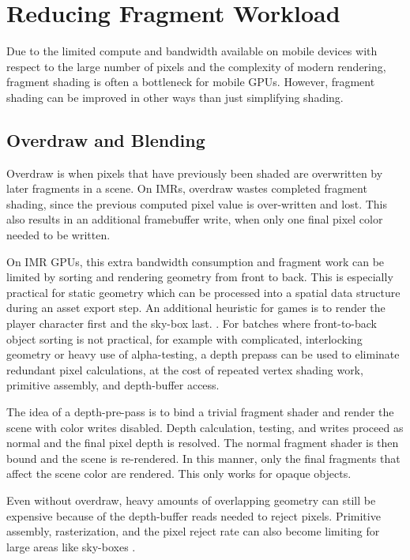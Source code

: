\section{Reducing Fragment Workload}
\label{Jon-McCaffrey-Reducing-Fragment-Workload}


Due to the limited compute and bandwidth available on mobile devices with
respect to the large number of pixels and the complexity of modern rendering,
fragment shading is often a bottleneck for mobile GPUs.  However, fragment
shading can be improved in other ways than just simplifying shading.

\subsection{Overdraw and Blending}\label{Jon-McCaffrey-Overdraw-And-Blending}
Overdraw is when pixels that have previously been shaded are overwritten by
later fragments in a scene.  On IMRs, overdraw wastes completed fragment
shading, since the previous computed pixel value is over-written and lost.
This also results in an additional framebuffer write, when only one final pixel
color needed to be written.

On IMR GPUs, this extra bandwidth consumption and fragment work can be limited
by sorting and rendering geometry from front to back.  This is especially
practical for static geometry which can be processed into a spatial data
structure during an asset export step.  An additional heuristic for games is to
render the player character first and the sky-box last.
\cite{Pranckevicius11a}.  For batches where front-to-back object sorting is not
practical, for example with complicated, interlocking geometry or heavy use of
alpha-testing, a depth prepass can be used to eliminate redundant pixel
calculations, at the cost of repeated vertex shading work, primitive assembly,
and depth-buffer access.

The idea of a depth-pre-pass is to bind a trivial fragment shader and render
the scene with color writes disabled.  Depth calculation, testing, and writes
proceed as normal and the final pixel depth is resolved.  The normal
fragment shader is then bound and the scene is re-rendered.  In this manner,
only the final fragments that affect the scene color are rendered.  This only
works for opaque objects.

Even without overdraw, heavy amounts of overlapping geometry can still be
expensive because of the depth-buffer reads needed to reject pixels.  Primitive
assembly, rasterization, and the pixel reject rate can also become limiting for
large areas like sky-boxes \cite{Pranckevicius11a}.

